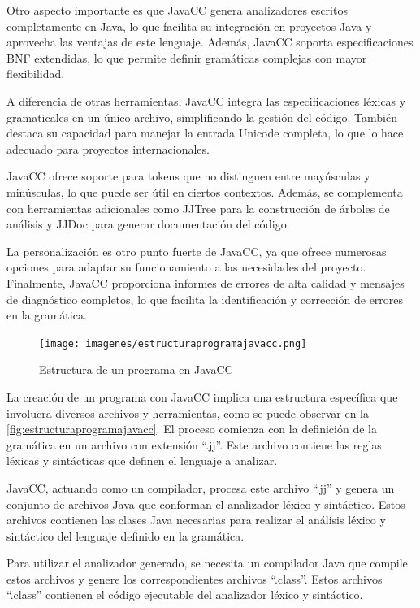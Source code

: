 Otro aspecto importante es que JavaCC genera analizadores escritos completamente en Java, lo que facilita su integración en proyectos Java y aprovecha las ventajas de este lenguaje. Además, JavaCC soporta especificaciones BNF extendidas, lo que permite definir gramáticas complejas con mayor flexibilidad.

A diferencia de otras herramientas, JavaCC integra las especificaciones léxicas y gramaticales en un único archivo, simplificando la gestión del código. También destaca su capacidad para manejar la entrada Unicode completa, lo que lo hace adecuado para proyectos internacionales.

JavaCC ofrece soporte para tokens que no distinguen entre mayúsculas y minúsculas, lo que puede ser útil en ciertos contextos. Además, se complementa con herramientas adicionales como JJTree para la construcción de árboles de análisis y JJDoc para generar documentación del código.

La personalización es otro punto fuerte de JavaCC, ya que ofrece numerosas opciones para adaptar su funcionamiento a las necesidades del proyecto. Finalmente, JavaCC proporciona informes de errores de alta calidad y mensajes de diagnóstico completos, lo que facilita la identificación y corrección de errores en la gramática.

\begin{figure}[H]
	\centering
	\texttt{[image: imagenes/estructuraprogramajavacc.png]}
	\caption{\label{fig:estructuraprogramajavacc}Estructura de un programa en JavaCC \cite{estructuraprogramajavacc}}
\end{figure}

La creación de un programa con JavaCC implica una estructura específica que involucra diversos archivos y herramientas, como se puede observar en la \autoref{fig:estructuraprogramajavacc}. El proceso comienza con la definición de la gramática en un archivo con extensión ``.jj''. Este archivo contiene las reglas léxicas y sintácticas que definen el lenguaje a analizar.

JavaCC, actuando como un compilador, procesa este archivo ``.jj'' y genera un conjunto de archivos Java que conforman el analizador léxico y sintáctico. %
Estos archivos contienen las clases Java necesarias para realizar el análisis léxico y sintáctico del lenguaje definido en la gramática.

Para utilizar el analizador generado, se necesita un compilador Java que compile estos archivos y genere los correspondientes archivos ``.class''. Estos archivos ``.class'' contienen el código ejecutable del analizador léxico y sintáctico.

